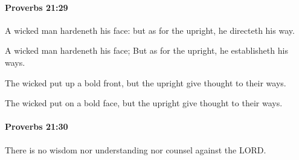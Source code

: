 		\paragraph{Proverbs 21:29} %
			\label{PROVERBS-21-29}

			A wicked man hardeneth his face: but as for the upright, he directeth his way.

			\begin{versebox}
					\item[BHS] 
					\item[ASV] A wicked man hardeneth his face; But as for the upright, he establisheth his ways.
					\item[NIV] The wicked put up a bold front, but the upright give thought to their ways.
					\item[NRSV] The wicked put on a bold face, but the upright give thought to their ways.
			\end{versebox}

		\paragraph{Proverbs 21:30} %
			\label{PROVERBS-21-30}

			There is no wisdom nor understanding nor counsel against the LORD.

